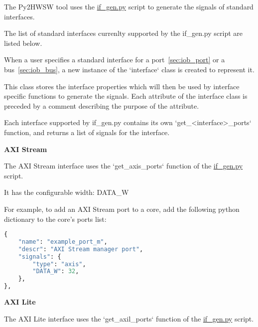 %

%
%

The Py2HWSW tool uses the \href{https://github.com/IObundle/py2hwsw/blob/main/py2hwsw/scripts/if_gen.py}{if\_gen.py} script to generate the signals of standard interfaces.

The list of standard interfaces currenlty supported by the if\_gen.py script are listed below.


When a user specifies a standard interface for a port~\ref{sec:iob_port} or a bus~\ref{sec:iob_bus}, a new instance of the `interface` class is created to represent it.


This class stores the interface properties which will then be used by interface specific functions to generate the signals.
Each attribute of the interface class is preceded by a comment describing the purpose of the attribute.

Each interface supported by if\_gen.py contains its own `get\_\textless interface\textgreater\_ports` function, and returns a list of signals for the interface.

%
%
\clearpage
\large\textbf{AXI Stream}

The AXI Stream interface uses the `get\_axis\_ports` function of the \href{https://github.com/IObundle/py2hwsw/blob/main/py2hwsw/scripts/if_gen.py}{if\_gen.py} script.


It has the configurable width: DATA\_W

For example, to add an AXI Stream port to a core, add the following python dictionary to the core's ports list:
\begin{lstlisting}[language=python]
{
	"name": "example_port_m",
	"descr": "AXI Stream manager port",
	"signals": {
		"type": "axis",
		"DATA_W": 32,
	},
},
\end{lstlisting}


%
%
\clearpage
\large\textbf{AXI Lite}

The AXI Lite interface uses the `get\_axil\_ports` function of the \href{https://github.com/IObundle/py2hwsw/blob/main/py2hwsw/scripts/if_gen.py}{if\_gen.py} script.

